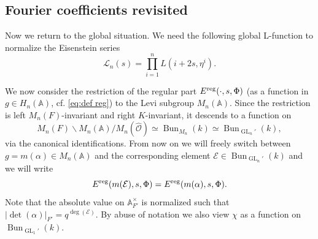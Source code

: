 \documentclass[reqno]{amsart}
\numberwithin{equation}{section}
\newcommand{\BA}{\ensuremath{\mathbb{A}}\xspace}
\newcommand{\sL}{\ensuremath{\mathscr{L}}\xspace}
\newcommand\mnote[1]{\marginpar{\tiny #1}}
\newcommand{\wh}[1]{\widehat{#1}}
\newcommand{\bs}{\backslash}
\DeclareMathOperator{\GL}{GL}
\DeclareMathOperator{\Bun}{Bun}
\DeclareMathOperator{\Den}{Den}
\newcommand\cE{\mathcal{E}}
\newcommand\cO{\mathcal{O}}
\theoremstyle{remark}
\numberwithin{equation}{section}
\begin{document}
%  

  
  
  




\subsection{Fourier coefficients revisited}\label{ss:FC} Now we return to the global situation. 
We need the following global L-function to normalize the Eisenstein series
\begin{equation}\label{eq: L-factor}
\sL_n(s)=\prod_{i=1}^nL(i+2s, \eta^i).
\end{equation}


We now consider the restriction of the regular part  $E^{\rm reg}(\cdot,s,\Phi)$ (as a function in $g\in H_n(\BA)$, cf. \eqref{eq:def reg}) to the Levi subgroup $M_n(\BA)$. Since the restriction is left $M_n(F)$-invariant and right $K$-invariant, it descends to a function on
$$M_n(F)\bs M_n(\BA)/M_n(\wh\cO)\simeq \Bun_{M_n}(k)\simeq \Bun_{\GL_n'}(k),
$$
via the canonical identifications.
From now on we will freely switch between $g=m(\alpha)\in M_n(\BA)$ and the corresponding element $\cE\in  \Bun_{\GL_n'}(k)$ and we will write 
$$
E^{\rm reg}(m(\cE),s,\Phi)=E^{\rm reg}(m(\alpha),s,\Phi).
$$
Note that the absolute value on $\BA_{F'}^\times$ is normalized such that $|\det(\alpha)|_{F'}=q^{\deg(\cE)}$. 
By abuse of notation we also view $\chi$ as a function on $\Bun_{\GL_1'}(k)$. 
\end{document}
